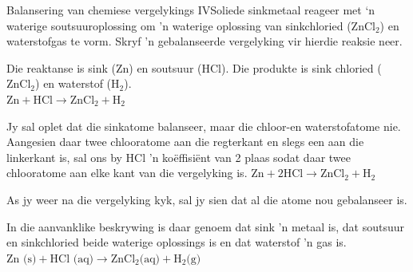       \noindent
\begin{wex}{Balansering van chemiese vergelykings IV}{Soliede sinkmetaal reageer met ‘n waterige soutsuuroplossing om 'n waterige oplossing van  sinkchloried ($\text{ZnCl}_{2}$) en waterstofgas te vorm. Skryf 'n gebalanseerde vergelyking vir hierdie reaksie neer.}{
Die reaktanse is sink ($\text{Zn}$) en soutsuur ($\text{HCl}$). Die produkte is sink chloried ($\text{ZnCl}_{2}$) en waterstof ($\text{H}_{2}$).\\


${\text{Zn} + \text{HCl} \rightarrow \text{ZnCl}_{2} + \text{H}_{2}}$


Jy sal oplet dat die sinkatome balanseer, maar die chloor-en waterstofatome nie. Aangesien daar twee chlooratome aan die regterkant en slegs een aan die linkerkant is, sal ons by HCl 'n ko\"{e}ffisiënt van 2 plaas sodat daar twee chlooratome aan elke kant van die  vergelyking is.
${\text{Zn} + 2\text{HCl} \rightarrow \text{ZnCl}_{2} + \text{H}_{2}}$


 As jy weer na die vergelyking kyk, sal jy sien dat al die atome nou gebalanseer is.


In die aanvanklike beskrywing is daar genoem dat sink 'n metaal is, dat soutsuur en sinkchloried beide waterige oplossings is  en dat waterstof 'n gas is.
$\text{Zn (s)} + \text{HCl (aq)} \rightarrow \text{ZnCl}_{2} \text{(aq)} + \text{H}_{2} \text{(g)}$
}
\end{wex}
    \noindent
\par


